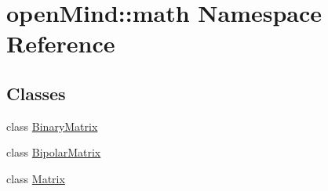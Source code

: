 \hypertarget{namespaceopen_mind_1_1math}{\section{open\+Mind\+:\+:math Namespace Reference}
\label{namespaceopen_mind_1_1math}
}
\subsection*{Classes}
\begin{DoxyCompactItemize}
\item 
class \hyperlink{classopen_mind_1_1math_1_1_binary_matrix}{Binary\+Matrix}
\item 
class \hyperlink{classopen_mind_1_1math_1_1_bipolar_matrix}{Bipolar\+Matrix}
\item 
class \hyperlink{classopen_mind_1_1math_1_1_matrix}{Matrix}
\end{DoxyCompactItemize}
